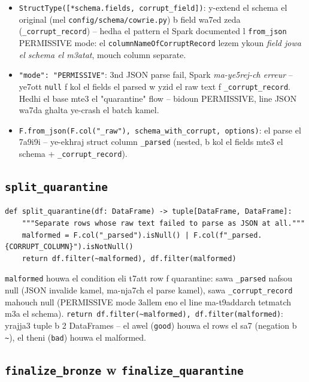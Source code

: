 \documentclass[11pt,a4paper]{report}
\DeclareRobustCommand{\code}[1]{\texttt{#1}}
\begin{document}
\begin{itemize}
  \item \code{StructType([*schema.fields, corrupt\_field])}: y-extend el
        schema el original (mel \code{config/schema/cowrie.py}) b field
        wa7ed zeda (\code{\_corrupt\_record}) -- hedha el pattern el
        Spark documented l \code{from\_json} PERMISSIVE mode: el
        \code{columnNameOfCorruptRecord} lezem ykoun \emph{field jowa el
        schema el m3atat}, mouch column separate.
  \item \code{"mode": "PERMISSIVE"}: 3nd JSON parse fail, Spark
        \emph{ma-ye5rej-ch erreur} -- ye7ott \code{null} f kol el fields
        el parsed w yzid el raw text f \code{\_corrupt\_record}. Hedhi el
        base mte3 el "quarantine" flow -- bidoun PERMISSIVE, line JSON
        wa7da ghalta ye-crash el batch kamel.
  \item \code{F.from\_json(F.col("\_raw"), schema\_with\_corrupt, options)}:
        el parse el 7a9i9i -- ye-ekhraj struct column \code{\_parsed}
        (nested, b kol el fields mte3 el schema + \code{\_corrupt\_record}).
\end{itemize}

\subsection{\code{split\_quarantine}}

\begin{lstlisting}[style=pystyle]
def split_quarantine(df: DataFrame) -> tuple[DataFrame, DataFrame]:
    """Separate rows whose raw text failed to parse as JSON at all."""
    malformed = F.col("_parsed").isNull() | F.col(f"_parsed.{CORRUPT_COLUMN}").isNotNull()
    return df.filter(~malformed), df.filter(malformed)
\end{lstlisting}

\code{malformed} houwa el condition eli t7att row f quarantine: sawa
\code{\_parsed} nafsou null (JSON invalide kamel, ma-nja7ch el parse
kamel), sawa \code{\_corrupt\_record} mahouch null (PERMISSIVE mode 3allem
eno el line ma-t9addarch tetmatch m3a el schema). \code{return
df.filter(\textasciitilde{}malformed), df.filter(malformed)}: yrajja3
tuple b 2 DataFrames -- el awel (\code{good}) houwa el rows el sa7
(negation b \code{\textasciitilde{}}), el theni (\code{bad}) houwa el
malformed.

\subsection{\code{finalize\_bronze} w \code{finalize\_quarantine}}
\end{document}
